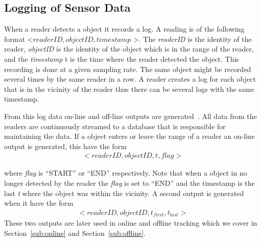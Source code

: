 \subsection{Logging of Sensor Data}
When a reader detects a object it records a log. 
A reading is of the following format \textless $readerID,objectID,timestamp$ \textgreater.
The \textit{readerID} is the identity of the reader, \textit{objectID} is the identity of the object which is in the range of the reader, and the \textit{timestamp} t is the time where the reader detected the object.
This recording is done at a given sampling rate. 
The same object might be recorded several times by the same reader in a row. 
A reader creates a log for each object that is in the vicinity of the reader thus there can be several logs with the same timestamp.

From this log data on-line and off-line outputs are generated~\cite{Jensen:2009:GMB:1590953.1591000}.
All data from the readers are continuously streamed to a database that is responsible for maintaining the data.
If a object enters or leave the range of a reader an on-line output is generated, this have the form
\begin{align}
<readerID,objectID,t,flag >
\end{align}

where \textit{flag} is "`START"' or "`END"' respectively. 
Note that when a object in no longer detected by the reader  the \textit{flag} is set to "`END"' and the timestamp is the last \textit{t} where the object was within the vicinity.
A second output is generated when it have the form 
\begin{align}
<\textit{$readerID,objectID,t_{first},t_{last}$}>
\end{align}
These two outputs are later used in online and offline tracking which we cover in Section~\ref{sub:online} and Section~\ref{sub:offline}.

 

